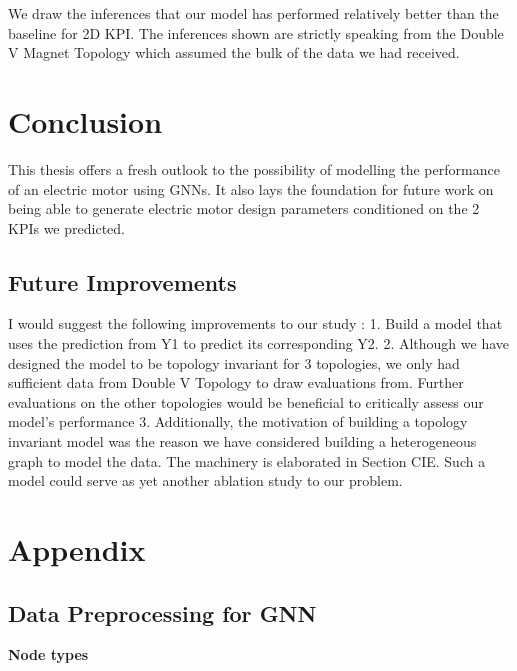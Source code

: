 \documentclass{report} %
\begin{document}
We draw the inferences that our model has performed relatively better than the baseline for 2D KPI.
The inferences shown are strictly speaking from the Double V Magnet Topology which assumed the bulk of the data we had received.
\newpage 

\chapter{Conclusion}

This thesis offers a fresh outlook to the possibility of modelling the performance of an electric motor using \ac{GNN}s.
It also lays the foundation for future work on being able to generate electric motor design parameters conditioned on the 2 KPIs we predicted.

\section{Future Improvements}\label{sec:Future Improvements}

I would suggest the following improvements to our study : \cite{EHR HGNN-2024}
1. Build a model that uses the prediction from Y1 to predict its corresponding Y2. 
2. Although we have designed the model to be topology invariant for 3 topologies, we only had sufficient data from Double V Topology to draw evaluations from.
Further evaluations on the other topologies would be beneficial to critically assess our model's performance
3. Additionally, the motivation of building a topology invariant model was the reason we have considered building a heterogeneous graph to model the data. The machinery is elaborated in Section CIE.
Such a model could serve as yet another ablation study to our problem.


\newpage 

\newpage 

\chapter*{Appendix}

\section{Data Preprocessing for \ac{GNN}}\label{sec:Data Preprocessing for GNN}


\textbf{Node types}
\end{document}
